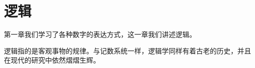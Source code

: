 \chapter{逻辑}\label{ch:Logic}
    第一章我们学习了各种数字的表达方式，这一章我们讲述逻辑。

    逻辑指的是客观事物的规律。与记数系统一样，逻辑学同样有着古老的历史，并且在现代的研究中依然熠熠生辉。
